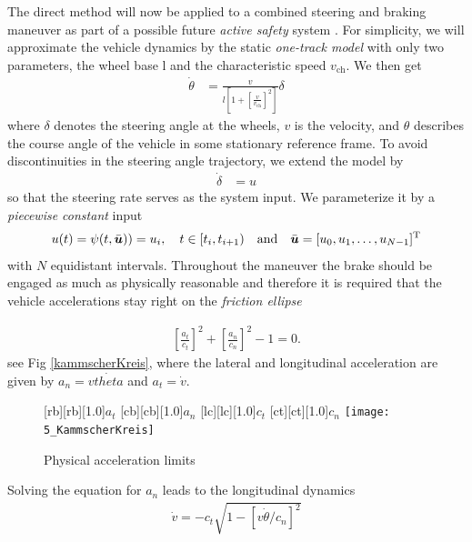 The direct method will now be applied to a combined steering and braking maneuver as part of a possible future \emph{active safety} system \cite{werling2012cdc}. %
For simplicity, we will approximate the vehicle dynamics by the static \emph{one-track model} with only two parameters, the wheel base l and the characteristic speed $v_\mathrm{ch}$. We then get
\begin{align}
\label{equ:thetadot}
\dot \theta &= \frac{v}{l \left[ 1 + \left[\frac{v}{v_{\text{ch}}}\right]^2\right]} \delta
\end{align}
where $\delta$ denotes the steering angle at the wheels, $v$ is the velocity, and $\theta$ describes the course angle of the vehicle in some stationary reference frame. To avoid discontinuities in the steering angle trajectory, we extend the model by
\begin{align*}
\dot \delta &= u
\end{align*}
so that the steering rate serves as the system input. We parameterize it by a \textit{piecewise constant} input
\begin{align*}
u(t)=\psi(t,\bar{\boldsymbol{u}}))=u_i, \quad  t \in [t_i,t_{i+1}) \quad \text{and} \quad \bar{\boldsymbol{u}} = [u_0,u_1,\dots,u_{N-1}]^{{\rm T}}
\end{align*}
with $N$ equidistant intervals.
Throughout the maneuver the brake should be engaged as much as physically reasonable and therefore it is required that the vehicle accelerations stay right on the \emph{friction ellipse}

\begin{align} \label{equ:ellipse}
\left[\frac{a_t}{c_t}\right]^2 + \left[\frac{a_n}{c_n}\right]^2 -1 = 0.
\end{align}
see Fig \ref{kammscherKreis}, where the lateral and longitudinal acceleration are given by $a_n=v \dot{theta}$ and $a_t=\dot{v}$.

\begin{figure}[h]%
\centering
    [rb][rb][1.0]{$a_t$}
    [cb][cb][1.0]{$a_n$}
    [lc][lc][1.0]{$c_t$}
    [ct][ct][1.0]{$c_n$}
    \texttt{[image: 5\_KammscherKreis]}
    \caption[Physical acceleration limits]{Physical acceleration limits}
    \label{fig:kammscherKreis}
\end{figure}%

Solving the equation for $a_n$ leads to the longitudinal dynamics 
\begin{align} \label{equ:replacement}
	\dot v = -c_t \sqrt{1-[v\dot\theta / c_n]^2}
\end{align}


